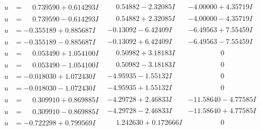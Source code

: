 \documentclass[1p]{elsarticle_modified}
\theoremstyle{definition}
\begin{document}
$$\begin{array}{c|c|c}
\begin{aligned}
u &= \phantom{-}0.739590 + 0.614293 I\end{aligned}
 & \phantom{-}0.54882 - 2.32085 I & -4.00000 + 4.35719 I \\ \hline\begin{aligned}
u &= \phantom{-}0.739590 - 0.614293 I\end{aligned}
 & \phantom{-}0.54882 + 2.32085 I & -4.00000 - 4.35719 I \\ \hline\begin{aligned}
u &= -0.355189 + 0.885687 I\end{aligned}
 & -0.13092 - 6.42409 I & -6.49563 + 7.55459 I \\ \hline\begin{aligned}
u &= -0.355189 - 0.885687 I\end{aligned}
 & -0.13092 + 6.42409 I & -6.49563 - 7.55459 I \\ \hline\begin{aligned}
u &= \phantom{-}0.053490 + 1.054100 I\end{aligned}
 & \phantom{-}0.50982 + 3.18183 I & \phantom{-0.000000 } 0 \\ \hline\begin{aligned}
u &= \phantom{-}0.053490 - 1.054100 I\end{aligned}
 & \phantom{-}0.50982 - 3.18183 I & \phantom{-0.000000 } 0 \\ \hline\begin{aligned}
u &= -0.018030 + 1.072430 I\end{aligned}
 & -4.95935 - 1.55132 I & \phantom{-0.000000 } 0 \\ \hline\begin{aligned}
u &= -0.018030 - 1.072430 I\end{aligned}
 & -4.95935 + 1.55132 I & \phantom{-0.000000 } 0 \\ \hline\begin{aligned}
u &= \phantom{-}0.309910 + 0.869885 I\end{aligned}
 & -4.29728 + 2.46833 I & -11.58640 - 4.77585 I \\ \hline\begin{aligned}
u &= \phantom{-}0.309910 - 0.869885 I\end{aligned}
 & -4.29728 - 2.46833 I & -11.58640 + 4.77585 I \\ \hline\begin{aligned}
u &= -0.722298 + 0.799569 I\end{aligned}
 & \phantom{-}1.242630 + 0.172666 I & \phantom{-0.000000 } 0 \\ \hline\begin{aligned}

\end{aligned}
\end{array}$$
\end{document}
